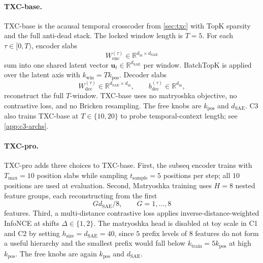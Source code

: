 \paragraph{TXC-base.}
TXC-base is the acausal temporal crosscoder from \cref{sec:txc} with TopK sparsity and the full anti-dead stack. The locked window length is $T=5$. For each $\tau\in[0,T)$, encoder slabs
\[
    W_{\mathrm{enc}}^{(\tau)}\in\mathbb{R}^{d_{\mathrm{in}}\times d_{\mathrm{SAE}}}
\]
sum into one shared latent vector $\mathbf u_t\in\mathbb{R}^{d_{\mathrm{SAE}}}$ per window. BatchTopK is applied over the latent axis with $k_{\mathrm{win}}=T k_{\mathrm{pos}}$. Decoder slabs
\[
    W_{\mathrm{dec}}^{(\tau)}\in\mathbb{R}^{d_{\mathrm{SAE}}\times d_{\mathrm{in}}},
    \qquad
    b_{\mathrm{dec}}^{(\tau)}\in\mathbb{R}^{d_{\mathrm{in}}},
\]
reconstruct the full $T$-window. TXC-base uses no matryoshka objective, no contrastive loss, and no Bricken resampling. The free knobs are $k_{\mathrm{pos}}$ and $d_{\mathrm{SAE}}$. C3 also trains TXC-base at $T\in\{10,20\}$ to probe temporal-context length; see \cref{app:c3-archs}.

\paragraph{TXC-pro.}
TXC-pro adds three choices to TXC-base. First, the subseq encoder trains with $T_{\max}=10$ position slabs while sampling $t_{\mathrm{sample}}=5$ positions per step; all $10$ positions are used at evaluation. Second, Matryoshka training uses $H=8$ nested feature groups, each reconstructing from the first
\[
    G d_{\mathrm{SAE}}/8,
    \qquad
    G=1,\ldots,8
\]
features. Third, a multi-distance contrastive loss applies inverse-distance-weighted InfoNCE at shifts $\Delta\in\{1,2\}$. The matryoshka head is disabled at toy scale in C1 and C2 by setting $h_{\mathrm{size}}=d_{\mathrm{SAE}}=40$, since $5$ prefix levels of $8$ features do not form a useful hierarchy and the smallest prefix would fall below $k_{\mathrm{train}}=5k_{\mathrm{pos}}$ at high $k_{\mathrm{pos}}$. The free knobs are again $k_{\mathrm{pos}}$ and $d_{\mathrm{SAE}}$.

